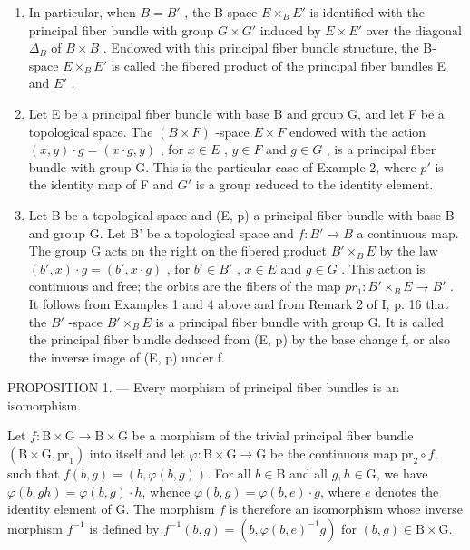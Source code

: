 \begin{enumerate}
\def\labelenumi{\arabic{enumi})}
\setcounter{enumi}{2}
\item
  In particular, when \(B = B'\) , the B-space \(E \times_{B} E'\) is identified with the principal fiber bundle with group \(G \times G'\) induced by \(E \times E'\) over the diagonal \(\Delta_{B}\) of \(B \times B\) . Endowed with this principal fiber bundle structure, the B-space \(E \times_{B} E'\) is called the fibered product of the principal fiber bundles E and \(E'\) .
\item
  Let E be a principal fiber bundle with base B and group G, and let F be a topological space. The \((B \times F)\) -space \(E \times F\) endowed with the action \((x, y) \cdot g = (x \cdot g, y)\) , for \(x \in E\) , \(y \in F\) and \(g \in G\) , is a principal fiber bundle with group G. This is the particular case of Example 2, where \(p'\) is the identity map of F and \(G'\) is a group reduced to the identity element.
\item
  Let B be a topological space and (E, p) a principal fiber bundle with base B and group G. Let B' be a topological space and \(f: B' \to B\) a continuous map. The group G acts on the right on the fibered product \(B' \times_{B} E\) by the law \((b', x) \cdot g = (b', x \cdot g)\) , for \(b' \in B'\) , \(x \in E\) and \(g \in G\) . This action is continuous and free; the orbits are the fibers of the map \(pr_{1}: B' \times_{B} E \to B'\) . It follows from Examples 1 and 4 above and from Remark 2 of I, p. 16 that the \(B'\) -space \(B' \times_{B} E\) is a principal fiber bundle with group G. It is called the principal fiber bundle deduced from (E, p) by the base change f, or also the inverse image of (E, p) under f.
\end{enumerate}

PROPOSITION 1. --- Every morphism of principal fiber bundles is an isomorphism.

Let \(f \colon \mathrm{B} \times \mathrm{G} \to \mathrm{B} \times \mathrm{G}\) be a morphism of the trivial principal fiber bundle \((\mathrm{B} \times \mathrm{G},\mathrm{pr}_1)\) into itself and let \(\varphi \colon \mathrm{B} \times \mathrm{G} \to \mathrm{G}\) be the continuous map \(\mathrm{pr}_2 \circ f\), such that \(f(b, g) = (b, \varphi(b, g))\). For all \(b \in \mathrm{B}\) and all \(g, h \in \mathrm{G}\), we have \(\varphi(b, gh) = \varphi(b, g) \cdot h\), whence \(\varphi(b, g) = \varphi(b, e) \cdot g\), where \(e\) denotes the identity element of \(\mathrm{G}\). The morphism \(f\) is therefore an isomorphism whose inverse morphism \(f^{-1}\) is defined by \(f^{-1}(b, g) = (b, \varphi(b, e)^{-1}g)\) for \((b, g) \in \mathrm{B} \times \mathrm{G}\).

